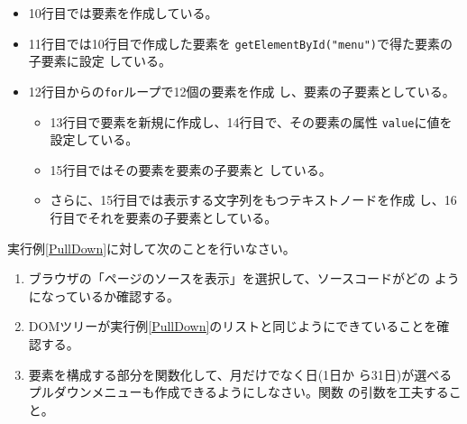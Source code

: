 \begin{Exec}
\begin{itemize}
 \item 10行目では要素を作成している。
 \item 11行目では10行目で作成した要素を
       \texttt{getElementById("menu")}で得た要素の子要素に設定
       している。 
 \item 12行目からの\texttt{for}ループで12個の要素を作成
       し、要素の子要素としている。
       \begin{itemize}
	\item 13行目で要素を新規に作成し、14行目で、その要素の属性
        \texttt{value}に値を設定している。
	\item 15行目ではその要素を要素の子要素と
	      している。
	\item さらに、15行目では表示する文字列をもつテキストノードを作成
	      し、16行目でそれを要素の子要素としている。
       \end{itemize}
\end{itemize}
\end{Exec}
\begin{Prob}\upshape
実行例\ref{PullDown}に対して次のことを行いなさい。
\begin{enumerate}
 \item ブラウザの「ページのソースを表示」を選択して、ソースコードがどの
       ようになっているか確認する。
 \item DOMツリーが実行例\ref{PullDown}のリストと同じようにできていることを確認する。
 \item {}要素を構成する部分を関数化して、月だけでなく日(1日か
       ら31日)が選べるプルダウンメニューも作成できるようにしなさい。関数
       の引数を工夫すること。
\end{enumerate}
\end{Prob}
